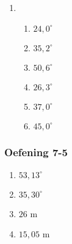 {\begin{multicols}{3}
\begin{enumerate}[noitemsep, label=\textbf{\arabic*}. ]
\item %
    \begin{enumerate}[noitemsep, label=\textbf{(\alph*)} ]
\item $24,0^{\circ}$
\item $35,2^{\circ}$
\item $50,6^{\circ}$
\item $26,3^{\circ}$
\item $37,0^{\circ}$
\item $45,0^{\circ}$
      \end{enumerate}
\end{enumerate}
\subsubsection*{Oefening 7-5} %
\begin{enumerate}[noitemsep, label=\textbf{\arabic*}. ] 

\item $53,13^{\circ}$%
\item $35,30^{\circ}$%
\item $26$ m%
\item $15,05$ m %

\end{enumerate}

    


\end{multicols}}

